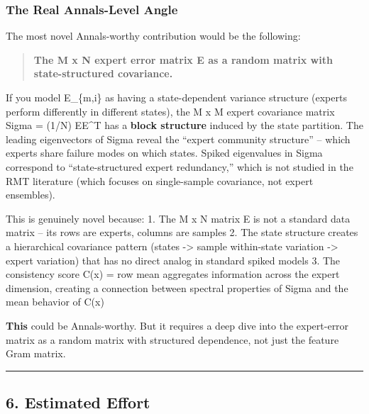 \documentclass[
  12pt,
]{article}
\begin{document}
\subsubsection{The Real Annals-Level
Angle}\label{the-real-annals-level-angle}

The most novel Annals-worthy contribution would be the following:

\begin{quote}
\textbf{The M x N expert error matrix E as a random matrix with
state-structured covariance.}
\end{quote}

If you model E\_\{m,i\} as having a state-dependent variance structure
(experts perform differently in different states), the M x M expert
covariance matrix Sigma = (1/N) EE\^{}T has a \textbf{block structure}
induced by the state partition. The leading eigenvectors of Sigma reveal
the ``expert community structure'' -- which experts share failure modes
on which states. Spiked eigenvalues in Sigma correspond to
``state-structured expert redundancy,'' which is not studied in the RMT
literature (which focuses on single-sample covariance, not expert
ensembles).

This is genuinely novel because: 1. The M x N matrix E is not a standard
data matrix -- its rows are experts, columns are samples 2. The state
structure creates a hierarchical covariance pattern (states
-\textgreater{} sample within-state variation -\textgreater{} expert
variation) that has no direct analog in standard spiked models 3. The
consistency score C(x) = row mean aggregates information across the
expert dimension, creating a connection between spectral properties of
Sigma and the mean behavior of C(x)

\textbf{This} could be Annals-worthy. But it requires a deep dive into
the expert-error matrix as a random matrix with structured dependence,
not just the feature Gram matrix.

\begin{center}\rule{0.5\linewidth}{0.5pt}\end{center}

\subsection{6. Estimated Effort}\label{estimated-effort}
\end{document}
